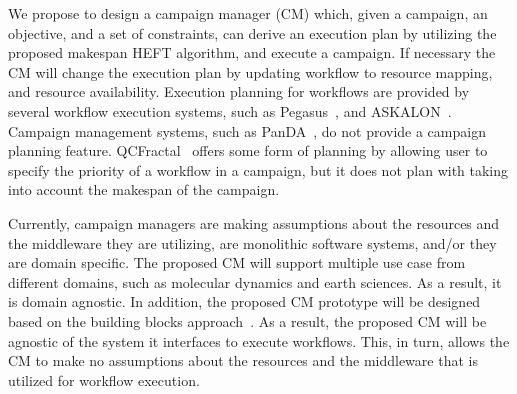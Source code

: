 
We propose to design a campaign manager (CM) which, given a campaign, an objective, and a set of constraints, can derive an execution plan by utilizing the proposed makespan HEFT algorithm, and execute a campaign.
If necessary the CM will change the execution plan by updating workflow to resource mapping, and resource availability.
Execution planning for workflows are provided by several workflow execution systems, such as Pegasus~\cite{deelman2015pegasus}, and ASKALON~\cite{fahringer2005askalon}.
Campaign management systems, such as PanDA~\cite{maeno2008panda}, do not provide a campaign planning feature.
QCFractal~\cite{qcfractal} offers some form of planning by allowing user to specify the priority of a workflow in a campaign, but it does not plan with taking into account the makespan of the campaign.

Currently, campaign managers are making assumptions about the resources and the middleware they are utilizing, are monolithic software systems, and/or they are domain specific.
The proposed CM will support multiple use case from different domains, such as molecular dynamics and earth sciences.
As a result, it is domain agnostic.
In addition, the proposed CM prototype will be designed based on the building blocks approach~\cite{turilli2019middleware}.
As a result, the proposed CM will be agnostic of the system it interfaces to execute workflows.
This, in turn, allows the CM to make no assumptions about the resources and the middleware that is utilized for workflow execution.

